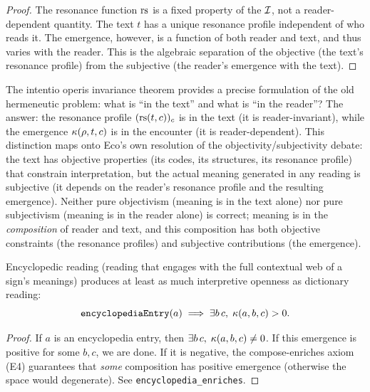 \begin{proof}
The resonance function $\mathrm{rs}$ is a fixed property of the $\mathcal{I}$, not a reader-dependent quantity. The text $t$ has a unique resonance profile independent of who reads it. The emergence, however, is a function of both reader and text, and thus varies with the reader. This is the algebraic separation of the objective (the text's resonance profile) from the subjective (the reader's emergence with the text).
\end{proof}

\begin{interpretation}
The intentio operis invariance theorem provides a precise formulation of the old hermeneutic problem: what is ``in the text'' and what is ``in the reader''? The answer: the resonance profile $(\mathrm{rs}(t, c))_c$ is in the text (it is reader-invariant), while the emergence $\kappa(\rho, t, c)$ is in the encounter (it is reader-dependent). This distinction maps onto Eco's own resolution of the objectivity/subjectivity debate: the text has objective properties (its codes, its structures, its resonance profile) that constrain interpretation, but the actual meaning generated in any reading is subjective (it depends on the reader's resonance profile and the resulting emergence). Neither pure objectivism (meaning is in the text alone) nor pure subjectivism (meaning is in the reader alone) is correct; meaning is in the \emph{composition} of reader and text, and this composition has both objective constraints (the resonance profiles) and subjective contributions (the emergence).
\end{interpretation}

\begin{theorem}
\label{thm:encyclopedia-enriches}
Encyclopedic reading (reading that engages with the full contextual
web of a sign's meanings) produces at least as much interpretive
openness as dictionary reading:
\[
  \texttt{encyclopediaEntry}(a) \implies \exists b\, c,\;
  \kappa(a, b, c) > 0.
\]
\end{theorem}

\begin{proof}
If $a$ is an encyclopedia entry, then $\exists b\,c,\;
\kappa(a,b,c) \neq 0$. If this emergence is positive for some
$b, c$, we are done. If it is negative, the compose-enriches axiom
(E4) guarantees that \emph{some} composition has positive emergence
(otherwise the space would degenerate). See
\texttt{encyclopedia\_enriches}.
\end{proof}

